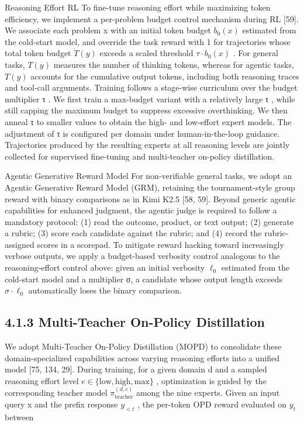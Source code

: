 \documentclass[
  10
]{article}
\begin{document}
Reasoning Effort RL To fine-tune reasoning effort while maximizing token
efficiency, we implement a per-problem budget control mechanism during
RL {[}59{]}. We associate each problem x with an initial token budget
\(b _ { 0 } ( x )\) estimated from the cold-start model, and override
the task reward with 1 for trajectories whose total token budget
\(\dot { T } ( y )\) exceeds a scaled threshold
\(\tau \cdot b _ { 0 } ( x )\) . For general tasks, \(T ( y )\) measures
the number of thinking tokens, whereas for agentic tasks, \(T ( y )\)
accounts for the cumulative output tokens, including both reasoning
traces and tool-call arguments. Training follows a stage-wise curriculum
over the budget multiplier τ . We first train a max-budget variant with
a relatively large τ , while still capping the maximum budget to
suppress excessive overthinking. We then anneal τ to smaller values to
obtain the high- and low-effort expert models. The adjustment of τ is
configured per domain under human-in-the-loop guidance. Trajectories
produced by the resulting experts at all reasoning levels are jointly
collected for supervised fine-tuning and multi-teacher on-policy
distillation.

Agentic Generative Reward Model For non-verifiable general tasks, we
adopt an Agentic Generative Reward Model (GRM), retaining the
tournament-style group reward with binary comparisons as in Kimi K2.5
{[}58, 59{]}. Beyond generic agentic capabilities for enhanced judgment,
the agentic judge is required to follow a mandatory protocol: (1) read
the outcome, product, or text output; (2) generate a rubric; (3) score
each candidate against the rubric; and (4) record the rubric-assigned
scores in a scorepad. To mitigate reward hacking toward increasingly
verbose outputs, we apply a budget-based verbosity control analogous to
the reasoning-effort control above: given an initial verbosity
\(\ell _ { 0 }\) estimated from the cold-start model and a multiplier σ,
a candidate whose output length exceeds \(\sigma \cdot \ell _ { 0 }\)
automatically loses the binary comparison.

\subsection{4.1.3 Multi-Teacher On-Policy
Distillation}\label{multi-teacher-on-policy-distillation}

We adopt Multi-Teacher On-Policy Distillation (MOPD) to consolidate
these domain-specialized capabilities across varying reasoning efforts
into a unified model {[}75, 134, 29{]}. During training, for a given
domain d and a sampled reasoning effort level
\(e \in \{ \mathrm { l o w } , \mathrm { h i g h } , \mathrm { m a x } \}\)
, optimization is guided by the corresponding teacher model
\(\pi _ { \mathrm { t e a c h e r } } ^ { ( d , e ) }\) among the nine
experts. Given an input query x and the prefix response \(y _ { < t }\)
, the per-token OPD reward evaluated on \(y _ { t }\) between
\end{document}

